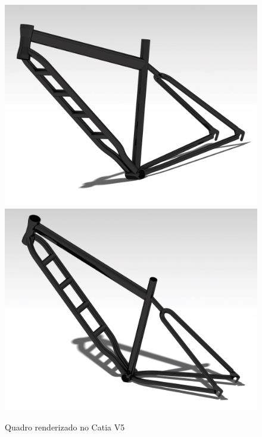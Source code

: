 	\graphicspath{{figuras/}}
	\begin{figure}[!htb]
		\centering
		\includegraphics[scale=0.035]{inter_render_2.jpg}
		\includegraphics[scale=0.035]{inter_render_1.jpg}
		\caption{Quadro renderizado no Catia V5}
		\label{img:inter_render}
	\end{figure}
	
	\newpage


